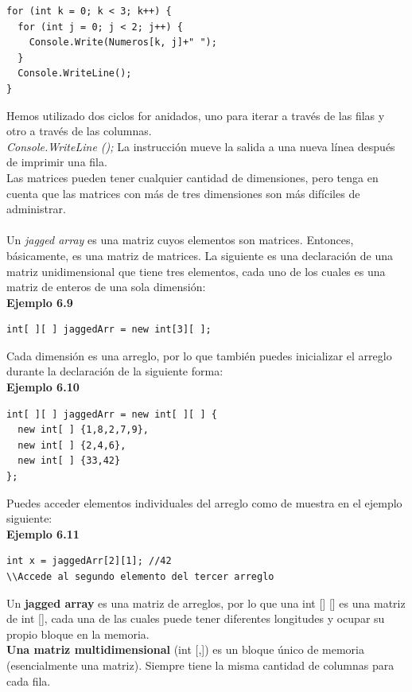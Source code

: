 \documentclass[12pt,a4paper]{report}
\begin{document}
\begin{lstlisting}
for (int k = 0; k < 3; k++) {
  for (int j = 0; j < 2; j++) {
    Console.Write(Numeros[k, j]+" ");
  }
  Console.WriteLine();
}
\end{lstlisting}Hemos utilizado dos ciclos for anidados, uno para iterar a través de las filas y otro a través de las columnas.\\\textit{Console.WriteLine ();} La instrucción mueve la salida a una nueva línea después de imprimir una fila.\\Las matrices pueden tener cualquier cantidad de dimensiones, pero tenga en cuenta que las matrices con más de tres dimensiones son más difíciles de administrar.\\\\Un \textit{jagged array} es una matriz cuyos elementos son matrices. Entonces, básicamente, es una matriz de matrices. La siguiente es una declaración de una matriz unidimensional que tiene tres elementos, cada uno de los cuales es una matriz de enteros de una sola dimensión:\\\textbf{Ejemplo 6.9}
\begin{lstlisting}
int[ ][ ] jaggedArr = new int[3][ ];
\end{lstlisting}Cada dimensión es una arreglo, por lo que también puedes inicializar el arreglo durante la declaración de la siguiente forma:\\\textbf{Ejemplo 6.10}
\begin{lstlisting}
int[ ][ ] jaggedArr = new int[ ][ ] {
  new int[ ] {1,8,2,7,9},
  new int[ ] {2,4,6},
  new int[ ] {33,42}
};
\end{lstlisting}Puedes acceder elementos individuales del arreglo como de muestra en el ejemplo siguiente:\\\textbf{Ejemplo 6.11}
\begin{lstlisting}
int x = jaggedArr[2][1]; //42
\\Accede al segundo elemento del tercer arreglo
\end{lstlisting}
Un \textbf{jagged array} es una matriz de arreglos, por lo que una int [] [] es una matriz de int [], cada una de las cuales puede tener diferentes longitudes y ocupar su propio bloque en la memoria.\\\textbf{Una matriz multidimensional} (int [,]) es un bloque único de memoria (esencialmente una matriz). Siempre tiene la misma cantidad de columnas para cada fila.
\end{document}

